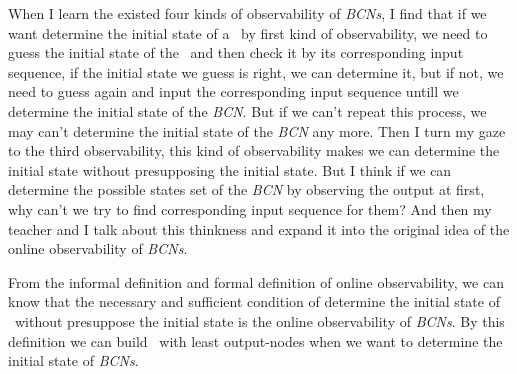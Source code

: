 When I learn the existed four kinds of observability of {\em BCNs}, I find that if we want determine the initial state of a \BCNs\ by first kind of observability, we need to guess the initial state of the \BCN\ and then check it by its corresponding input sequence, if the initial state we guess is right, we can determine it, but if not, we need to guess again and input the corresponding input sequence untill we determine the initial state of the {\em BCN}. But if we can't repeat this process, we may can't determine the initial state of the {\em BCN} any more. Then I turn my gaze to the third observability, this kind of observability makes we can determine the initial state without presupposing the initial state. But I think if we can determine the possible states set of the {\em BCN} by observing the output at first, why can't we try to find corresponding input sequence for them? And then my teacher and I talk about this thinkness and expand it into the original idea of the online observability of {\em BCNs}. 

From the informal definition and formal definition of online observability, we can know that the necessary and sufficient condition of determine the initial state of \BCNs\ without presuppose the initial state is the online observability of {\em BCNs}. By this definition we can build \BCNs\ with least output-nodes when we want to determine the initial state of {\em BCNs}.
